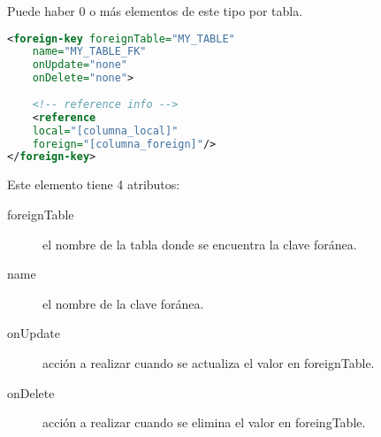 Puede haber 0 o más elementos de este tipo por tabla.

\begin{lstlisting}[language=xml]
<foreign-key foreignTable="MY_TABLE"
	name="MY_TABLE_FK"
	onUpdate="none"
	onDelete="none">
	
	<!-- reference info -->
	<reference
	local="[columna_local]"
	foreign="[columna_foreign]"/>
</foreign-key>
\end{lstlisting}

Este elemento tiene 4 atributos:

\begin{description}
	\item[foreignTable] el nombre de la tabla donde se encuentra la clave foránea.
	\item[name] el nombre de la clave foránea.
	\item[onUpdate] acción a realizar cuando se actualiza el valor en foreignTable.
	\item[onDelete] acción a realizar cuando se elimina el valor en foreingTable.
\end{description}